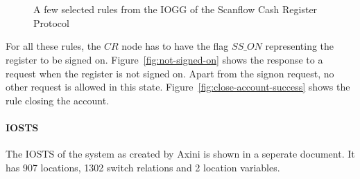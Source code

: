 \begin{figure}[ht]
  \begin{center}
    \hspace{20px}
    \\
    \hspace{20px}
    \\
    \hspace{20px}
  \end{center}
  \caption{A few selected rules from the IOGG of the Scanflow Cash Register Protocol}
  \label{fig:gg-scrp}
\end{figure}

For all these rules, the $CR$ node has to have the flag $\mathit{SS\_ON}$ representing the register to be signed on. Figure~\ref{fig:not-signed-on} shows the response to a request when the register is not signed on. Apart from the signon request, no other request is allowed in this state. Figure~\ref{fig:close-account-success} shows the rule closing the account.

\paragraph*{IOSTS} The IOSTS of the system as created by Axini is shown in a seperate document. It has 907 locations, 1302 switch relations and 2 location variables.